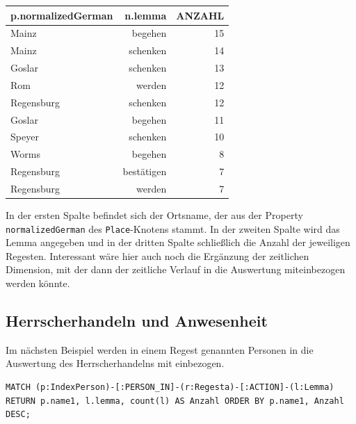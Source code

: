 \documentclass[ngerman,]{scrreprt}
\begin{document}
\begin{longtable}[]{@{}lrr@{}}
\toprule
p.normalizedGerman & n.lemma & ANZAHL\tabularnewline
\midrule
\endhead
Mainz & begehen & 15\tabularnewline
Mainz & schenken & 14\tabularnewline
Goslar & schenken & 13\tabularnewline
Rom & werden & 12\tabularnewline
Regensburg & schenken & 12\tabularnewline
Goslar & begehen & 11\tabularnewline
Speyer & schenken & 10\tabularnewline
Worms & begehen & 8\tabularnewline
Regensburg & bestätigen & 7\tabularnewline
Regensburg & werden & 7\tabularnewline
\bottomrule
\end{longtable}

In der ersten Spalte befindet sich der Ortsname, der aus der Property \texttt{normalizedGerman} des \texttt{Place}-Knotens stammt. In der zweiten Spalte wird das Lemma angegeben und in der dritten Spalte schließlich die Anzahl der jeweiligen Regesten. Interessant wäre hier auch noch die Ergänzung der zeitlichen Dimension, mit der dann der zeitliche Verlauf in die Auswertung miteinbezogen werden könnte.

\subsection{Herrscherhandeln und Anwesenheit}\label{herrscherhandeln-und-anwesenheit}

Im nächsten Beispiel werden in einem Regest genannten Personen in die Auswertung des Herrscherhandelns mit einbezogen.

\begin{verbatim}
MATCH (p:IndexPerson)-[:PERSON_IN]-(r:Regesta)-[:ACTION]-(l:Lemma)
RETURN p.name1, l.lemma, count(l) AS Anzahl ORDER BY p.name1, Anzahl DESC;
\end{verbatim}
\end{document}
